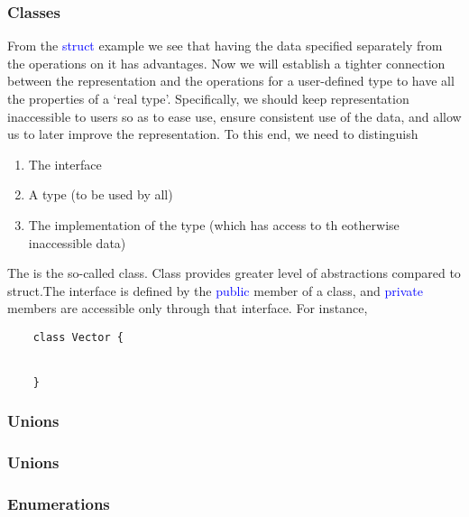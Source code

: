 \documentclass{article}
\newcommand{\be}[1]{\textcolor{blue}{#1}}
\begin{document}
\subsubsection{Classes}
From the \be{struct} example we see that having the data specified separately from the operations on it 
has advantages. Now we will establish a tighter connection between the representation and the operations for a user-defined type to have all the properties of a `real type'. Specifically, we should keep representation inaccessible to users so as to ease use, ensure consistent use of the data, and allow us to later improve the representation. To this end, we need to distinguish
\begin{enumerate}
	\item The interface
	\item A type (to be used by all)
	\item The implementation of the type (which has access to th eotherwise inaccessible data)
\end{enumerate}
The is the so-called class. Class provides greater level of abstractions compared to struct.The interface is defined by the \be{public} member of a class, and \be{private} members are accessible only through that interface. For instance,
\begin{verbatim}
	class Vector {
	
	
	}
\end{verbatim}
\subsubsection{Unions}

\subsubsection{Unions}

\subsubsection{Enumerations}
%
\end{document}
